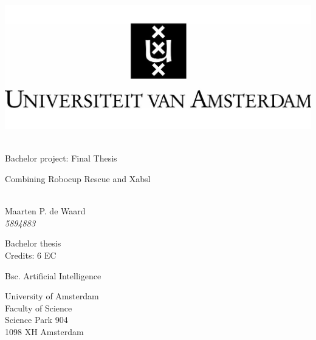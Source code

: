 \onecolumn
\begin{center}
\thispagestyle{empty}


\vspace{2.5cm}

\includegraphics[width=.7\textwidth]{uva.jpg}\\
\vspace{0.5cm}
\hrulefill\\
\begin{Huge}
Bachelor project: Final Thesis\\
\end{Huge}
\vspace{0.2cm}
\begin{Large} 
Combining Robocup Rescue and Xabsl\\
\end{Large}
\hrulefill\\

{
\Large
Maarten P. de Waard\\\vspace{0.2cm}
\textit{5894883}
}

\vspace{1.5cm}

Bachelor thesis\\
Credits: 6 EC

\vspace{0.5cm}

Bsc. Artificial Intelligence

\vspace{0.25cm}

University of Amsterdam\\
Faculty of Science\\
Science Park 904\\
1098 XH Amsterdam


\end{center}
